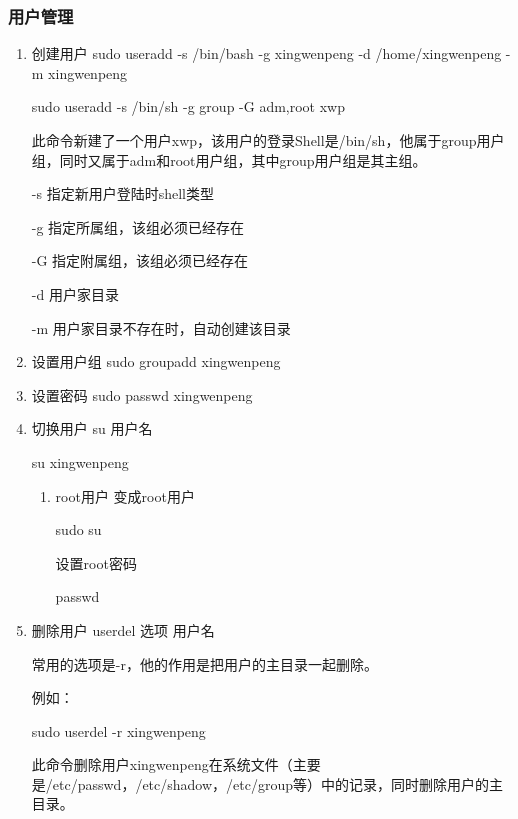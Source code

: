 \documentclass[11pt]{article}
\begin{document}
\subsubsection{用户管理}
\label{sec-1-1-10}
\begin{enumerate}
\item 创建用户
\label{sec-1-1-10-1}
sudo useradd -s /bin/bash -g xingwenpeng -d /home/xingwenpeng -m xingwenpeng

sudo useradd -s /bin/sh -g group -G adm,root xwp

此命令新建了一个用户xwp，该用户的登录Shell是/bin/sh，他属于group用户组，同时又属于adm和root用户组，其中group用户组是其主组。

-s 指定新用户登陆时shell类型

-g 指定所属组，该组必须已经存在

-G 指定附属组，该组必须已经存在

-d 用户家目录

-m 用户家目录不存在时，自动创建该目录

\item 设置用户组
\label{sec-1-1-10-2}
sudo groupadd xingwenpeng
\item 设置密码
\label{sec-1-1-10-3}
sudo passwd xingwenpeng
\item 切换用户
\label{sec-1-1-10-4}
su 用户名

su xingwenpeng
\begin{enumerate}
\item root用户
\label{sec-1-1-10-4-1}
变成root用户

sudo su

设置root密码

passwd
\end{enumerate}
\item 删除用户
\label{sec-1-1-10-5}
userdel 选项 用户名

常用的选项是-r，他的作用是把用户的主目录一起删除。

例如：

sudo userdel -r xingwenpeng

此命令删除用户xingwenpeng在系统文件（主要是/etc/passwd，/etc/shadow，/etc/group等）中的记录，同时删除用户的主目录。
\end{enumerate}
\end{document}
